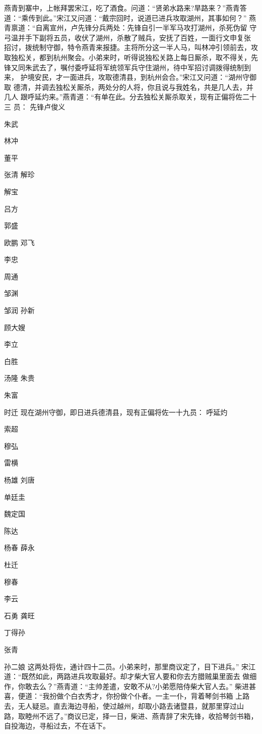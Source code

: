 燕青到寨中，上帐拜罢宋江，吃了酒食。问道：“贤弟水路来?旱路来？”燕青答
道：“乘传到此。”宋江又问道：“戴宗回时，说道已进兵攻取湖州，其事如何？”
燕青禀道：“自离宣州，卢先锋分兵两处：先锋自引一半军马攻打湖州，杀死伪留
守弓温并手下副将五员，收伏了湖州，杀散了贼兵，安抚了百姓，一面行文申复张
招讨，拨统制守御，特令燕青来报捷。主将所分这一半人马，叫林冲引领前去，攻
取独松关，都到杭州聚会。小弟来时，听得说独松关路上每日厮杀，取不得关，先
锋又同朱武去了，嘱付委呼延将军统领军兵守住湖州，待中军招讨调拨得统制到来，
护境安民，才一面进兵，攻取德清县，到杭州会合。”宋江又问道：“湖州守御取
德清，并调去独松关厮杀，两处分的人将，你且说与我姓名，共是几人去，并几人
跟呼延灼来。”燕青道：“有单在此。分去独松关厮杀取关，现有正偏将佐二十三
员：
先锋卢俊义

朱武

林冲

董平

张清
解珍

解宝

吕方

郭盛

欧鹏
邓飞

李忠

周通

邹渊

邹润
孙新

顾大嫂

李立

白胜

汤隆
朱贵

朱富

时迁
现在湖州守御，即日进兵德清县，现有正偏将佐一十九员：
呼延灼

索超

穆弘

雷横

杨雄
刘唐

单廷圭

魏定国

陈达

杨春
薛永

杜迁

穆春

李云

石勇
龚旺

丁得孙

张青

孙二娘
这两处将佐，通计四十二员。小弟来时，那里商议定了，目下进兵。”
宋江道：“既然如此，两路进兵攻取最好。却才柴大官人要和你去方腊贼巢里面去
做细作，你敢去么？”燕青道：“主帅差遣，安敢不从?小弟愿陪侍柴大官人去。”
柴进甚喜，便道：“我扮做个白衣秀才，你扮做个仆者。一主一仆，背着琴剑书箱
上路去，无人疑忌。直去海边寻船，使过越州，却取小路去诸暨县，就那里穿过山
路，取睦州不远了。”商议已定，择一日，柴进、燕青辞了宋先锋，收拾琴剑书箱，
自投海边，寻船过去，不在话下。

